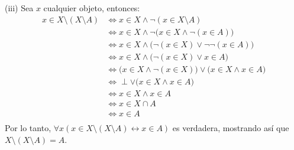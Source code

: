 \documentclass[letterpaper,DIV=14,headsepline,12pt]{scrartcl}
\makeatletter
\renewenvironment{proof}[1][]{%
        \par\pushQED{\qed}%
        \normalfont\topsep6pt \partopsep0pt %
        \trivlist
        \item[\hskip\labelsep
                \textbf{\textit{Demostración.}}%
        ]#1
        }{%
        \popQED\endtrivlist\@endpefalse
    }
\makeatother
\begin{document}
\begin{proof}
        (iii) Sea $x$ cualquier objeto, entonces:
        \begin{align*}
            x \in X \setminus (X \setminus A) & \Leftrightarrow x \in X \land \lnot(x \in X \setminus A) \tag*{Definición de $\setminus$} \\
            & \Leftrightarrow x \in X \land \lnot\big(x \in X \land \lnot(x \in A) \big) \tag*{Definición de $\setminus$} \\
            & \Leftrightarrow x \in X \land \big( \lnot(x \in X) \lor \lnot \lnot(x \in A) \big) \tag*{Ley de De Morgan} \\
            & \Leftrightarrow x \in X \land \big( \lnot(x \in X) \lor x \in A \big) \tag*{Doble negación} \\
            & \Leftrightarrow \big( x \in X \land \lnot(x \in X) \big) \lor \big( x \in X \land x \in A \big) \tag*{Distribución de $\land$ en $\lor$} \\
            & \Leftrightarrow \perp \lor \big( x \in X \land x \in A \big) \tag*{$\gamma \land \lnot \gamma$ es contradicción} \\
            & \Leftrightarrow x \in X \land x \in A \tag*{$\perp \lor \: \gamma \equiv \gamma$} \\
            & \Leftrightarrow x \in X \cap A \tag*{Definición de $\cap$} \\\
            & \Leftrightarrow x \in A \tag*{Como $A \subseteq X$, se puede aplicar el inciso anterior} \\
        \end{align*}
        Por lo tanto, $\forall x ( x \in X \setminus (X \setminus A) \leftrightarrow x \in A )$ es verdadera, mostrando así que $X \setminus (X \setminus A) = A$.
    \end{proof}
\end{document}
